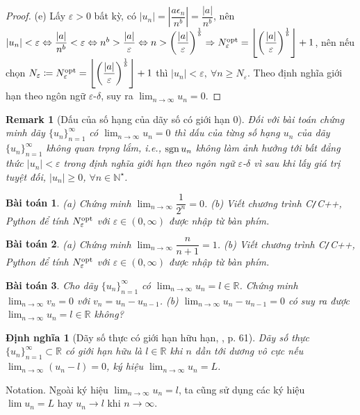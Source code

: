 \documentclass[oneside]{book}
\newtheorem{baitoan}{Bài toán}
\newtheorem{dinhnghia}{Định nghĩa}
\newtheorem{remark}{Remark}
\begin{document}
\begin{proof}
	\item(e) Lấy $\varepsilon > 0$ bất kỳ, có $|u_n| = \left|\dfrac{a\epsilon_n}{n^b}\right| = \dfrac{|a|}{n^b}$, nên $|u_n| < \varepsilon\Leftrightarrow\dfrac{|a|}{n^b} < \varepsilon\Leftrightarrow n^b > \dfrac{|a|}{\varepsilon}\Leftrightarrow n > \left(\dfrac{|a|}{\varepsilon}\right)^{\frac{1}{b}}\Rightarrow N_\varepsilon^{\rm opt} = \left\lfloor\left(\dfrac{|a|}{\varepsilon}\right)^{\frac{1}{b}}\right\rfloor + 1$, nên nếu chọn $N_\varepsilon\coloneqq N_\varepsilon^{\rm opt} = \left\lfloor\left(\dfrac{|a|}{\varepsilon}\right)^{\frac{1}{b}}\right\rfloor + 1$ thì $|u_n| < \varepsilon,\ \forall n\ge N_\varepsilon$. Theo định nghĩa giới hạn theo ngôn ngữ $\varepsilon$-$\delta$, suy ra $\lim_{n\to\infty} u_n = 0$.
\end{proof}

\begin{remark}[Dấu của số hạng của dãy số có giới hạn $0$]
	Đối với bài toán chứng minh dãy $\{u_n\}_{n=1}^\infty$ có $\lim_{n\to\infty} u_n = 0$ thì dấu của từng số hạng $u_n$ của dãy $\{u_n\}_{n=1}^\infty$ không quan trọng lắm, i.e., ${\rm sgn}\,u_n$ không làm ảnh hưởng tới bất đẳng thức $|u_n| < \varepsilon$ trong định nghĩa giới hạn theo ngôn ngữ $\varepsilon$-$\delta$ vì sau khi lấy giá trị tuyệt đối, $|u_n|\ge0$, $\forall n\in\mathbb{N}^\star$.
\end{remark}

\begin{baitoan}
	(a) Chứng minh $\lim_{n\to\infty} \dfrac{1}{2^n} = 0$. (b) Viết chương trình {\sf C{\tt/}C++, Python} để tính $N_\varepsilon^{\rm opt}$ với $\varepsilon\in(0,\infty)$ được nhập từ bàn phím.
\end{baitoan}

\begin{baitoan}
	(a) Chứng minh $\lim_{n\to\infty} \dfrac{n}{n + 1} = 1$. (b) Viết chương trình {\sf C{\tt/}C++, Python} để tính $N_\varepsilon^{\rm opt}$ với $\varepsilon\in(0,\infty)$ được nhập từ bàn phím.
\end{baitoan}

\begin{baitoan}
	Cho dãy $\{u_n\}_{n=1}^\infty$ có $\lim_{n\to\infty} u_n = l\in\mathbb{R}$. Chứng minh $\lim_{n\to\infty} v_n = 0$ với $v_n = u_n - u_{n-1}$. (b) $\lim_{n\to\infty} u_n - u_{n-1} = 0$ có suy ra được $\lim_{n\to\infty} u_n = l\in\mathbb{R}$ không?
\end{baitoan}

\begin{dinhnghia}[Dãy số thực có giới hạn hữu hạn,  \cite{SGK_Toan_11_CD_tap_1}, p. 61]
	\label{def: sequence lim}
	Dãy số thực $\{u_n\}_{n=1}^\infty\subset\mathbb{R}$ có giới hạn hữu là $l\in\mathbb{R}$ khi $n$ dần tới dương vô cực nếu $\lim_{n\to\infty} (u_n - l) = 0$, ký hiệu $\lim_{n\to\infty} u_n = L$.  
\end{dinhnghia}
{\sf Notation.} Ngoài ký hiệu $\lim_{n\to\infty} u_n = l$, ta cũng sử dụng các ký hiệu $\lim u_n = L$ hay $u_n\to l$ khi $n\to\infty$.
\end{document}
